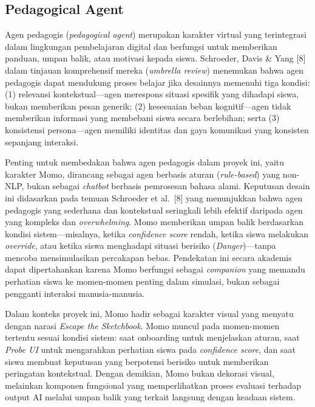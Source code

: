 \subsection{Pedagogical Agent}
\label{subsec:pedagogical-agent}

Agen pedagogis (\textit{pedagogical agent}) merupakan karakter virtual yang terintegrasi dalam lingkungan pembelajaran digital dan berfungsi untuk memberikan panduan, umpan balik, atau motivasi kepada siswa. Schroeder, Davis \& Yang [8] dalam tinjauan komprehensif mereka (\textit{umbrella review}) menemukan bahwa agen pedagogis dapat mendukung proses belajar jika desainnya memenuhi tiga kondisi: (1) relevansi kontekstual---agen merespons situasi spesifik yang dihadapi siswa, bukan memberikan pesan generik; (2) kesesuaian beban kognitif---agen tidak memberikan informasi yang membebani siswa secara berlebihan; serta (3) konsistensi persona---agen memiliki identitas dan gaya komunikasi yang konsisten sepanjang interaksi.

Penting untuk membedakan bahwa agen pedagogis dalam proyek ini, yaitu karakter Momo, dirancang sebagai agen berbasis aturan (\textit{rule-based}) yang non-NLP, bukan sebagai \textit{chatbot} berbasis pemrosesan bahasa alami. Keputusan desain ini didasarkan pada temuan Schroeder et al.\ [8] yang menunjukkan bahwa agen pedagogis yang sederhana dan kontekstual seringkali lebih efektif daripada agen yang kompleks dan \textit{overwhelming}. Momo memberikan umpan balik berdasarkan kondisi sistem---misalnya, ketika \textit{confidence score} rendah, ketika siswa melakukan \textit{override}, atau ketika siswa menghadapi situasi berisiko (\textit{Danger})---tanpa mencoba mensimulasikan percakapan bebas. Pendekatan ini secara akademis dapat dipertahankan karena Momo berfungsi sebagai \textit{companion} yang memandu perhatian siswa ke momen-momen penting dalam simulasi, bukan sebagai pengganti interaksi manusia-manusia.

Dalam konteks proyek ini, Momo hadir sebagai karakter visual yang menyatu dengan narasi \textit{Escape the Sketchbook}. Momo muncul pada momen-momen tertentu sesuai kondisi sistem: saat onboarding untuk menjelaskan aturan, saat \textit{Probe UI} untuk mengarahkan perhatian siswa pada \textit{confidence score}, dan saat siswa membuat keputusan yang berpotensi berisiko untuk memberikan peringatan kontekstual. Dengan demikian, Momo bukan dekorasi visual, melainkan komponen fungsional yang memperlihatkan proses evaluasi terhadap output AI melalui umpan balik yang terkait langsung dengan keadaan sistem.

